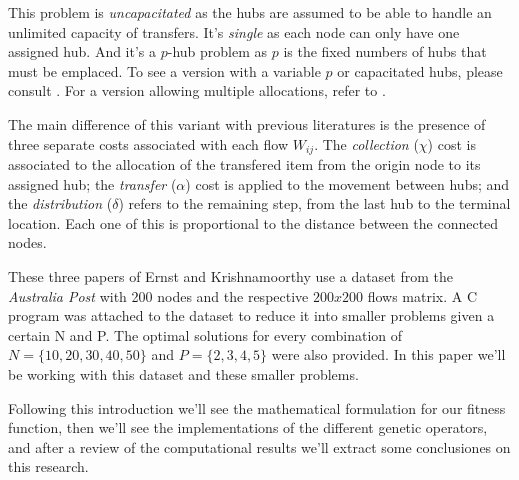 This problem is \emph{uncapacitated} as the hubs are assumed to be able to handle an unlimited
capacity of transfers. It's \emph{single} as each node can only have one assigned hub. And
it's a $p$-hub problem as $p$ is the fixed numbers of hubs that must be emplaced. To see a version
with a variable $p$ or capacitated hubs, please consult \cite{Ernst1999}. For a version
allowing multiple allocations, refer to \cite{Ernst1998}.

The main difference of this variant with previous literatures is the presence of three separate
costs associated with each flow $W_{ij}$. The \emph{collection} ($\chi$) cost is associated to the allocation
of the transfered item from the origin node to its assigned hub; the \emph{transfer} ($\alpha$) cost is
applied to the movement between hubs; and the \emph{distribution} ($\delta$) refers to the remaining step,
from the last hub to the terminal location. Each one of this is proportional to the distance between
the connected nodes.

These three papers of Ernst and Krishnamoorthy use a dataset from the \emph{Australia Post} with 200
nodes and the respective $200x200$ flows matrix. A C program was attached to the dataset to reduce
it into smaller problems given a certain N and P. The optimal solutions for every combination of
$N = \{10, 20, 30, 40, 50\}$ and $P = \{2, 3, 4, 5\}$ were also provided. In this paper we'll
be working with this dataset and these smaller problems.

Following this introduction we'll see the mathematical formulation for our fitness function, then
we'll see the implementations of the different genetic operators, and after a review of the
computational results we'll extract some conclusiones on this research.
